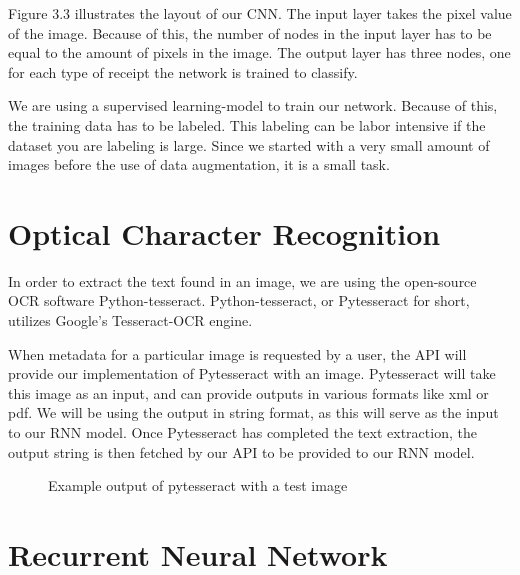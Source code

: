 Figure 3.3 illustrates the layout of our CNN.
The input layer takes the pixel value of the image.
Because of this, the number of nodes in the input layer has to be equal to the amount of pixels in the image.
The output layer has three nodes, one for each type of receipt the network is trained to classify.

We are using a supervised learning-model to train our network.
Because of this, the training data has to be labeled.
This labeling can be labor intensive if the dataset you are labeling is large.
Since we started with a very small amount of images before the use of data augmentation, it is a small task.

\section{Optical Character Recognition}\label{sec:OCR}
In order to extract the text found in an image, we are using the open-source OCR software Python-tesseract.
Python-tesseract, or Pytesseract for short, utilizes Google's Tesseract-OCR engine.

When metadata for a particular image is requested by a user, the API will provide our implementation of Pytesseract with an image.
Pytesseract will take this image as an input, and can provide outputs in various formats like xml or pdf.
We will be using the output in string format, as this will serve as the input to our RNN model.
Once Pytesseract has completed the text extraction, the output string is then fetched by our API to be provided to our RNN model.

\begin{figure}[h]
    \caption{Example output of pytesseract with a test image}
    \label{fig:figure3.5}
\end{figure}

\section{Recurrent Neural Network}\label{sec:RNN}

